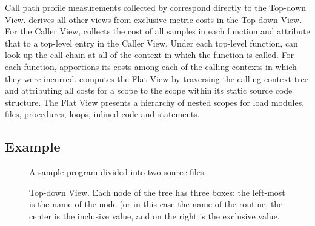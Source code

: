Call path profile measurements collected by \hpcrun{} correspond directly to the Top-down View.
\hpcviewer{} derives all other views from exclusive metric costs in the Top-down View.
For the Caller View, \hpcviewer{} collects the cost of all samples in each function and attribute that to a top-level entry in the Caller View.
Under each top-level function, \hpcviewer{} can look up the call chain at all of the context in which the function is called.
For each function, \hpcviewer{} apportions its costs among each of the calling contexts in which they were incurred.
\hpcviewer{} computes the Flat View by traversing the calling context tree and attributing all costs for a scope to the scope within its static source code structure.
The Flat View presents a hierarchy of nested scopes for load modules, files, procedures, loops, inlined code and statements.



\subsection{Example}

\begin{figure}[t]
\caption{A sample program divided into two source files.}
\label{fig:source-files}
\end{figure}



\begin{figure}[t]
\caption{Top-down View. Each node of the tree has three boxes: the left-most is the name of the node (or in this case the name of the routine, the center is the inclusive value, and on the right is the exclusive value.}
\label{fig:cct}
\end{figure}

